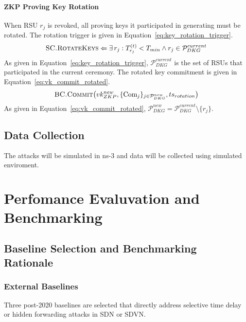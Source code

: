 \documentclass[12pt, a4paper]{report}
\begin{document}
{{\subsubsection{ZKP Proving Key Rotation}
When \ac{RSU} $r_j$ is revoked, all proving keys it
participated in generating must be rotated. The rotation
trigger is given in
Equation~\eqref{eq:key_rotation_trigger}.
\begin{equation}
\textsc{SC.RotateKeys}\Leftarrow
\exists\,r_j:T_{r_j}^{(t)}<T_{min}
\land r_j\in\mathcal{P}_{DKG}^{current}
\label{eq:key_rotation_trigger}
\end{equation}
As given in Equation~\eqref{eq:key_rotation_trigger},
$\mathcal{P}_{DKG}^{current}$ is the set of \ac{RSU}s
that participated in the current ceremony. The rotated
key commitment is given in
Equation~\eqref{eq:vk_commit_rotated}.
\begin{equation}
\textsc{BC.Commit}\!\left(vk_{ZKP}^{new},
\{\text{Com}_j\}_{j\in\mathcal{P}_{DKG}^{new}},
ts_{rotation}\right)
\label{eq:vk_commit_rotated}
\end{equation}
As given in Equation~\eqref{eq:vk_commit_rotated},
$\mathcal{P}_{DKG}^{new}{=}
\mathcal{P}_{DKG}^{current}\setminus\{r_j\}$.










\section{Data Collection}
The attacks will be simulated in ns-3 and data will be collected using simulated enviroment.



\chapter{Perfomance Evaluvation and Benchmarking}
\section{Baseline Selection and Benchmarking Rationale}
\label{sec:baselines}

\subsection{External Baselines}
Three post-2020 baselines are selected that directly address selective
time delay or hidden forwarding attacks in SDN or SDVN.

}}
\end{document}

